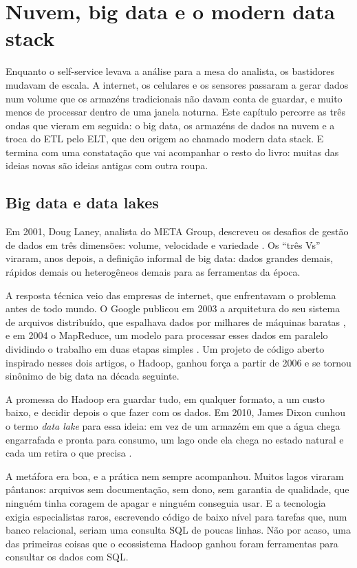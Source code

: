 \chapter{Nuvem, big data e o modern data stack}
\label{cap:nuvem}

Enquanto o self-service levava a análise para a mesa do analista, os bastidores
mudavam de escala. A internet, os celulares e os sensores passaram a gerar dados num
volume que os armazéns tradicionais não davam conta de guardar, e muito menos de
processar dentro de uma janela noturna. Este capítulo percorre as três ondas que vieram
em seguida: o big data, os armazéns de dados na nuvem e a troca do ETL pelo ELT, que deu
origem ao chamado modern data stack. E termina com uma constatação que vai acompanhar o
resto do livro: muitas das ideias novas são ideias antigas com outra roupa.

\section{Big data e data lakes}
\label{sec:big-data}

Em 2001, Doug Laney, analista do META Group, descreveu os desafios de gestão de dados em
três dimensões: volume, velocidade e variedade \parencite{laney2001}. Os \enquote{três
Vs} viraram, anos depois, a definição informal de big data: dados grandes demais, rápidos
demais ou heterogêneos demais para as ferramentas da época.

A resposta técnica veio das empresas de internet, que enfrentavam o problema antes de
todo mundo. O Google publicou em 2003 a arquitetura do seu sistema de arquivos
distribuído, que espalhava dados por milhares de máquinas baratas
\parencite{ghemawat2003}, e em 2004 o MapReduce, um modelo para processar esses dados
em paralelo dividindo o trabalho em duas etapas simples \parencite{dean2004}. Um projeto
de código aberto inspirado nesses dois artigos, o Hadoop, ganhou força a partir de 2006 e
se tornou sinônimo de big data na década seguinte.

A promessa do Hadoop era guardar tudo, em qualquer formato, a um custo baixo, e decidir
depois o que fazer com os dados. Em 2010, James Dixon cunhou o termo \emph{data lake}
para essa ideia: em vez de um armazém em que a água chega engarrafada e pronta para
consumo, um lago onde ela chega no estado natural e cada um retira o que precisa
\parencite{dixon2010}.

A metáfora era boa, e a prática nem sempre acompanhou. Muitos lagos viraram pântanos:
arquivos sem documentação, sem dono, sem garantia de qualidade, que ninguém tinha
coragem de apagar e ninguém conseguia usar. E a tecnologia exigia especialistas raros,
escrevendo código de baixo nível para tarefas que, num banco relacional, seriam uma
consulta SQL de poucas linhas. Não por acaso, uma das primeiras coisas que o ecossistema
Hadoop ganhou foram ferramentas para consultar os dados com SQL.

